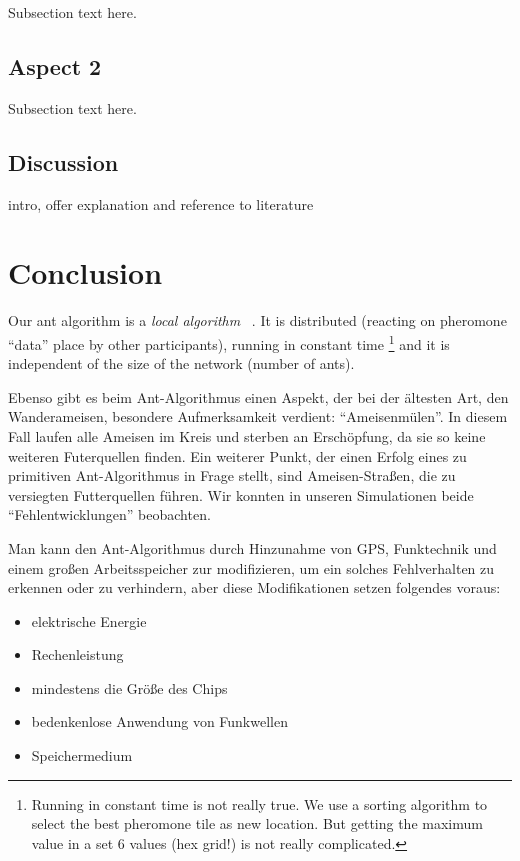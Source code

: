Subsection text here.

\subsection{Aspect 2}\label{aspect-2}

Subsection text here.

\subsection{Discussion}\label{discussion}

intro, offer explanation and reference to literature

\section{Conclusion}\label{conclusion}

Our ant algorithm is a \emph{local algorithm} ~\cite{suomela2013}. It is
distributed (reacting on pheromone ``data'' place by other
participants), running in constant time \footnote{Running in constant
  time is not really true. We use a sorting algorithm to select the best
  pheromone tile as new location. But getting the maximum value in a set
  6 values (hex grid!) is not really complicated.} and it is independent
of the size of the network (number of ants).

Ebenso gibt es beim Ant-Algorithmus einen Aspekt, der bei der ältesten
Art, den Wanderameisen, besondere Aufmerksamkeit verdient:
``Ameisenmülen''. In diesem Fall laufen alle Ameisen im Kreis und
sterben an Erschöpfung, da sie so keine weiteren Futerquellen finden.
Ein weiterer Punkt, der einen Erfolg eines zu primitiven Ant-Algorithmus
in Frage stellt, sind Ameisen-Straßen, die zu versiegten Futterquellen
führen. Wir konnten in unseren Simulationen beide ``Fehlentwicklungen''
beobachten.

Man kann den Ant-Algorithmus durch Hinzunahme von GPS, Funktechnik und
einem großen Arbeitsspeicher zur modifizieren, um ein solches
Fehlverhalten zu erkennen oder zu verhindern, aber diese Modifikationen
setzen folgendes voraus:

\begin{itemize}
\tightlist
\item
  elektrische Energie
\item
  Rechenleistung
\item
  mindestens die Größe des Chips
\item
  bedenkenlose Anwendung von Funkwellen
\item
  Speichermedium
\end{itemize}

